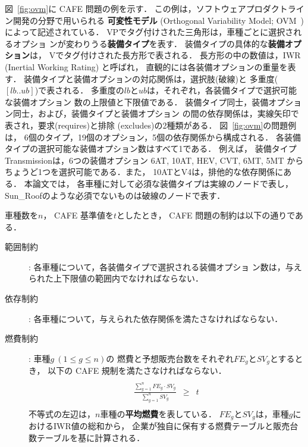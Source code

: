 
図~\ref{fig:ovm}に CAFE 問題の例を示す．
この例は，ソフトウェアプロダクトライン開発の分野で用いられる
\textbf{可変性モデル} (Orthogonal Variability Model; OVM~\cite{Pohl05:sple})
によって記述されている．
%
\textsf{VP}でタグ付けされた三角形は，車種ごとに選択されるオプショ
ンが変わりうる\textbf{装備タイプ}を表す．
装備タイプの具体的な\textbf{装備オプション}は，
\textsf{V}でタグ付けされた長方形で表される．
長方形の中の数値は，IWR (Inertial Working Rating) と呼ばれ，
直観的には各装備オプションの重量を表す．
装備タイプと装備オプションの対応関係は，選択肢(破線)と
多重度($[lb..ub]$)で表される．
多重度の$lb$と$ub$は，それぞれ，各装備タイプで選択可能な装備オプション
数の上限値と下限値である．
装備タイプ同士，装備オプション同士，および，装備タイプと装備オプション
の間の依存関係は，実線矢印で表され，要求(\textsf{requires})と排除
(\textsf{excludes})の2種類がある．
%
図~\ref{fig:ovm}の問題例は，
6個のタイプ，19個のオプション，5個の依存関係から構成される．
各装備タイプの選択可能な装備オプション数はすべて1である．
例えば，
装備タイプ\textsf{Transmission}は，6つの装備オプション
\textsf{6AT},
\textsf{10AT},
\textsf{HEV},
\textsf{CVT},
\textsf{6MT},
\textsf{5MT}
からちょうど1つを選択可能である．また，
\textsf{10AT}と\textsf{V4}は，排他的な依存関係にある．
%
本論文では，
各車種に対して必須な装備タイプは実線のノードで表し，
\textsf{Sun\_Roof}のような必須でないものは破線のノードで表す．

車種数を$n$，
CAFE 基準値を$t$としたとき，
CAFE 問題の制約は以下の通りである．
\begin{description}
\item[範囲制約]: 各車種について，各装備タイプで選択される装備オプショ
    ン数は，与えられた上下限値の範囲内でなければならない．
\item[依存制約]: 各車種について，与えられた依存関係を満たさなければならない．
\item[燃費制約]: 車種$g\ (1\leq g\leq n)$の
  燃費と予想販売台数をそれぞれ$FE_{g}$と$SV_{g}$とするとき，
  以下の CAFE 規制を満たさなければならない．
  \[\begin{array}{lcr}
      & & \\
      \displaystyle\frac{\sum_{g=1}^{n} FE_{g}\cdot SV_{g}}{\sum_{g=1}^{n} SV_{g}}
      &
        \geq 
      &
        t \\
      & & 
    \end{array}\]
  不等式の左辺は，$n$車種の\textbf{平均燃費}を表している．
  $FE_{g}$と$SV_{g}$は，車種$g$におけるIWR値の総和から，
  企業が独自に保有する燃費テーブルと販売台数テーブルを基に計算される．
\end{description}

